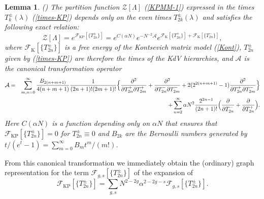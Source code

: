 \documentclass[11pt]{article}
\def\bea{\begin{eqnarray}}
\def\eea{\end{eqnarray}}
\def\bea{\begin{eqnarray}}
\def\eea{\end{eqnarray}}
\def\pa{\partial}
\def\beq{\begin{equation}}
\def\eeq{\end{equation}}
\theoremstyle{plain}
\newtheorem{lemma}{Lemma}
\theoremstyle{definition}
\let\text=\mathrm
\def\beq{\begin{equation}}
\def\eeq{\end{equation}}
\def\bea{\begin{eqnarray}}
\def\eea{\end{eqnarray}}
\begin{document}
\begin{lemma}\label{lm:canonical}{\rm(\cite{Ch95})}
The partition function ${\mathcal Z}[\Lambda]$ (\ref{KPMM-1})
expressed in the times $T^\pm_{k}(\lambda)$ (\ref{times-KP}) depends only on the even times $T^\pm_{2k}(\lambda)$
and satisfies the following exact relation:
\beq
{\mathcal Z}[\Lambda]=e^{{\mathcal F}_{\text{KP}}[\{T^\pm_{2n}\}]}
=e^{C(\alpha N)}e^{-N^{-2}{\mathcal A}}e^{{\mathcal F}_{\text{K}}[\{T^+_{2n}\}]+{\mathcal F}_{\text{K}}[\{T^-_{2n}\}]},
\label{canonical}
\eeq
where ${\mathcal F}_{\text{K}}[\{T^\pm_{2n}\}]$ is a free energy of the
Kontsevich matrix model (\ref{Kont}), $T^\pm_{2n}$ given by (\ref{times-KP}) are therefore the times of the KdV hierarchies, 
and ${\mathcal A}$ is the canonical transformation operator
\bea
{\mathcal A}&=&\sum_{m,n=0}^\infty \frac{B_{2(n+m+1)}}{4(n+m+1)}\frac{1}{(2n+1)!(2m+1)!}
\Bigl\{\frac{\pa^2}{\pa T^+_{2n}\pa T^+_{2m}}+\frac{\pa^2}{\pa T^-_{2n}\pa T^-_{2m}}+
2(2^{2(n+m+1)}-1)\frac{\pa^2}{\pa T^+_{2n}\pa T^-_{2m}}\Bigr\}\nonumber\\
&{}&+\sum_{n=2}^\infty \alpha N^2\frac{2^{2n-1}}{(2n+1)!}\Bigl(\frac{\pa}{\pa T^-_{2n}}+\frac{\pa}{\pa T^+_{2n}} \Bigr).
\label{A}
\eea
Here $C(\alpha N)$ is a function depending only on $\alpha N$ that ensures that
${\mathcal F}_{\text{KP}}[\{T^\pm_{2n}\}]=0$ for $T^\pm_{2n}\equiv 0$ and $B_{2k}$ are the Bernoulli numbers
generated by $t/(e^t-1)=\sum_{m=0}^\infty B_mt^m/(m!)$.
\end{lemma}



From this canonical transformation we immediately obtain the (ordinary) graph representation for the
term ${\mathcal F}_{g,s}[\{T^\pm_{2n}\}]$ of the expansion of
$$
{\mathcal F}_{\text{KP}}[\{T^\pm_{2n}\}]=\sum_{g,s} N^{2-2g}\alpha^{2-2g-s} {\mathcal F}_{g,s}[\{T^\pm_{2n}\}].
$$
\end{document}
